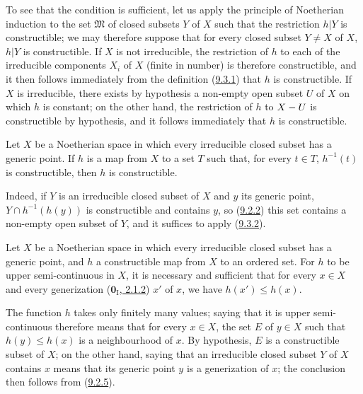 To see that the condition is sufficient, let us apply the principle of
Noetherian induction to the set $\mathfrak{M}$ of closed subsets $Y$
of $X$ such that the restriction $h|Y$ is constructible; we may therefore
suppose that for every closed subset $Y\ne X$ of $X$, $h|Y$ is
constructible. If $X$ is not irreducible, the restriction of $h$ to
each of the irreducible components $X_i$ of $X$ (finite in number) is therefore
constructible, and it then follows immediately from the definition
(\hyperref[0.9.3.1]{9.3.1}) that $h$ is constructible. If $X$ is
irreducible, there exists by hypothesis a non-empty open subset $U$ of $X$
on which $h$ is constant; on the other hand, the restriction of $h$ to
$X- U$ is constructible by hypothesis, and it follows immediately
that $h$ is constructible.

\begin{corollary}[9.3.3]
\label{0.9.3.3}
Let $X$ be a Noetherian space in which every irreducible closed subset
has a generic point. If $h$ is a map from $X$ to a set
$T$ such that, for every $t\in T$, $h^{-1}(t)$ is constructible, then $h$
is constructible.
\end{corollary}

Indeed, if $Y$ is an irreducible closed subset of $X$ and $y$ its generic
point, $Y\cap h^{-1}(h(y))$ is constructible and contains $y$, so
(\hyperref[0.9.2.2]{9.2.2}) this set contains a non-empty open subset of
$Y$, and it suffices to apply (\hyperref[0.9.3.2]{9.3.2}).

\begin{proposition}[9.3.4]
\label{0.9.3.4}
Let $X$ be a Noetherian space in which every irreducible closed subset
has a generic point, and $h$ a constructible map from $X$ to an
ordered set. For $h$ to be upper semi-continuous in $X$,
it is necessary and sufficient that for every $x\in X$ and every generization
\textup{(\hyperref[0.2.1.2]{$\mathbf{0}_{\mathrm{I}}$, 2.1.2})} $x'$ of $x$, we have
$h(x')\leq h(x)$.
\end{proposition}

The function $h$ takes only finitely many values; saying that it is
upper semi-continuous therefore means that for every $x\in X$,
the set $E$ of $y\in X$ such that $h(y)\leq h(x)$ is a neighbourhood of $x$.
By hypothesis, $E$ is a constructible subset of $X$; on the other hand, saying
that an irreducible closed subset $Y$ of $X$ contains $x$ means that its
generic point $y$ is a generization of $x$; the conclusion then follows
from (\hyperref[0.9.2.5]{9.2.5}).

